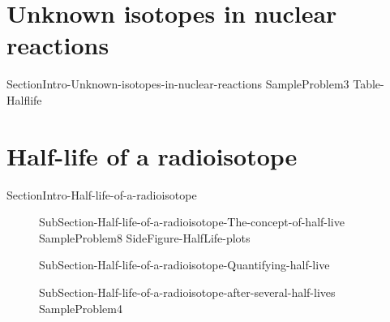\documentclass[main.tex]{subfiles}
\newcommand\chapterlabel{Ch-nuclear}\setcounter{figurenewcounter}{0}\setcounter{tablenewcounter}{0}\setcounter{formulanewcounter}{0}\chapterpicture{../{\chapterlabel}/figure1}\chapterpicturelabel{PxFuel}
\begin{document}
\section{Unknown isotopes in nuclear reactions}
{SectionIntro-Unknown-isotopes-in-nuclear-reactions}
  {SampleProblem3}
{Table-Halflife}


 

\section{Half-life of a radioisotope}{SectionIntro-Half-life-of-a-radioisotope}
\sloppy \begin{description}
\item[]{SubSection-Half-life-of-a-radioisotope-The-concept-of-half-live}
  {SampleProblem8}
  {SideFigure-HalfLife-plots}
  \item[]{SubSection-Half-life-of-a-radioisotope-Quantifying-half-live}
\item[] {SubSection-Half-life-of-a-radioisotope-after-several-half-lives}
{SampleProblem4}
\end{description}
\end{document}
